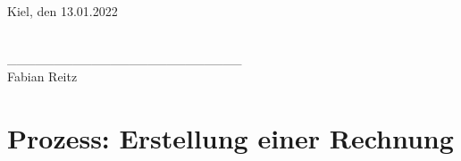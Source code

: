 \documentclass[a4paper]{scrartcl}
\begin{document}
Kiel, den 13.01.2022 \\ \\ 

\begin{tabbing}
	\_\_\_\_\_\_\_\_\_\_\_\_\_\_\_\_\_\_\_\_\_\_\_\_\_ \\
	Fabian Reitz
\end{tabbing}


\newpage

\appendix
\section{Prozess: Erstellung einer Rechnung}
\end{document}
